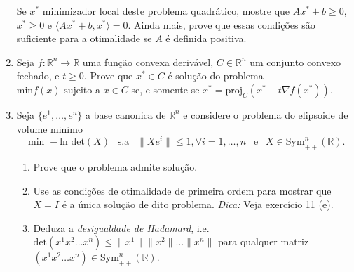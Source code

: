 \documentclass[a4paper,latin]{article}
\begin{document}
\begin{enumerate}
    Se $x^*$ minimizador local deste problema quadrático, mostre que 
    $Ax^*+b \geq 0$, $x^* \geq 0$ e $\langle Ax^*+b, x^*\rangle=0$. 
    Ainda mais, prove que essas condições são suficiente para a otimalidade se $A$ é definida positiva.
    \item Seja $f:\mathbb{R}^{n}\rightarrow \mathbb{R}$ uma função convexa derivável, $C \in \mathbb{R}^n$ um conjunto convexo fechado, e $t\geq 0$. Prove que $x^* \in C$ é solução do problema 
    $\text{min} f(x) \text{ sujeito a } x \in C$ 
    se, e somente se
    $x^*=\text{proj}_{C}(x^*-t\nabla f(x^*))$. 
    \item Seja $\{e^1,\dots,e^n\}$ a base canonica de 
    $\mathbb{R}^n$ e considere o problema 
    do elipsoide de volume minimo 
    $$ \text{ min } -\text{ln det}(X) \ \ 
       \text{ s.a  } \ \ 
       \|Xe^i\|\leq 1, \forall i=1,\dots, n \ \ 
       \text{ e } \ \ 
       X \in \text{Sym}_{++}^{n}(\mathbb{R}).$$
      \begin{enumerate}
      	\item Prove que o problema admite solução.
      	\item Use as condições de otimalidade de primeira ordem para mostrar que $X=I$ é a única solução 
      	de dito problema. {\it Dica: } Veja exercício 11 (e).
      	\item Deduza a {\it desigualdade de Hadamard}, 
      	i.e.  $\text{det} (x^1 x^2 \dots x^n)\leq 
      	\|x^1\|\|x^2\|\dots\|x^n\|$ para qualquer matriz
      	$(x^1 x^2 \dots x^n) 
      	\in \text{Sym}_{++}^{n}(\mathbb{R})$.
      \end{enumerate} 
   \end{enumerate}    
\end{document}
